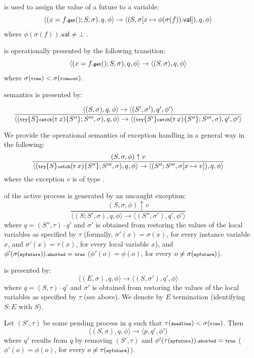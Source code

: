 is used to assign the value of a future to a variable:
$$ \langle  (x=f.{\textnormal{\textbf{{\scriptsize\texttt{get}}}}}(); S, \sigma), q, \phi\rangle \rightarrow \langle (S, \sigma [x \mapsto \phi(\sigma(f)).\mathsf{val}]), q, \phi\rangle $$
where $ \phi(\sigma(f)).\mathsf{val} \neq \bot$ .

 is operationally presented by the following transition:
$$ \langle  (x=f.{\textnormal{\textbf{{\scriptsize\texttt{get}}}}}(); S, \sigma), q, \phi\rangle \rightarrow \langle (S, \sigma), q, \phi\rangle $$
where $\sigma({\scriptsize\texttt{time}})< \sigma({\scriptsize\texttt{timeout}})$.

 semantics is presented by: 

$$ 
\frac
{\langle (S,\sigma),q, \phi\rangle \rightarrow \langle (S', \sigma'), q', \phi'\rangle}
{\langle ({\scriptsize\texttt{try}}\{ S \}{\scriptsize\texttt{catch}}({\scriptsize\texttt{T}} \; x)\{S''\};S''', \sigma), q, \phi\rangle \rightarrow \langle ({\scriptsize\texttt{try}}\{ S' \}{\scriptsize\texttt{catch}}({\scriptsize\texttt{T}} \; x)\{S''\};S''', \sigma), q', \phi'\rangle}
$$ 

We provide the operational semantics of exception handling in a general way in the following:
$$
\frac
{(S,\sigma,\phi) \uparrow v}
{\langle ({\scriptsize\texttt{try}}\{ S \}{\scriptsize\texttt{catch}}({\scriptsize\texttt{T}} \; x)\{S''\};S''', \sigma), q, \phi\rangle \rightarrow \langle  (S'';S''', \sigma[x\mapsto v]), q, \phi\rangle}
$$
where the exception $v$ is  of type .

 of the active process is generated by an uncaught exception:
$$
\frac
{(S,\sigma,\phi)\uparrow v}
{\langle (S;S', \sigma), q, \phi\rangle \rightarrow \langle (S'',\sigma'), q', \phi'\rangle}
$$
where $q = (S'',\tau) \cdot q' $ and $\sigma'$ is obtained from restoring the values of the local variables
as specified by $\tau$ (formally, $\sigma'(x)=\sigma(x)$, for every instance variable $x$, and $\sigma'(x)=\tau(x)$, for every local variable $x$), and  $\phi'(\sigma({\scriptsize\texttt{myfuture}})).{\scriptsize\texttt{aborted}} = {\scriptsize\texttt{true}}$
($\phi'(o)=\phi(o)$, for every $o\not= \sigma({\scriptsize\texttt{myfuture}})$).

 is presented by:
$$
\langle (E, \sigma), q, \phi\rangle \rightarrow \langle  (S,\sigma'), q', \phi\rangle
$$
where $q = (S,\tau) \cdot q'$ and $\sigma'$ is obtained from restoring the values of the local variables
as specified by $\tau$ (see above).
We denote by $E$ termination (identifying $S;E$ with $S$).



Let  $(S', \tau)$ be some  pending process  in $q$ such that $\tau(\textbf{{\scriptsize\texttt{deadline}}}) < \sigma({\scriptsize\texttt{time}})$.
Then
$$
\langle  (S,\sigma), q, \phi\rangle \rightarrow \langle p, q', \phi'\rangle 
$$
where $q'$ results from $q$ by removing $(S',\tau)$ and $\phi'(\tau({\scriptsize\texttt{myfuture}})).{\scriptsize\texttt{aborted}} = {\scriptsize\texttt{true}}$
($\phi'(o)=\phi(o)$, for every $o\not= \tau({\scriptsize\texttt{myfuture}})$).


